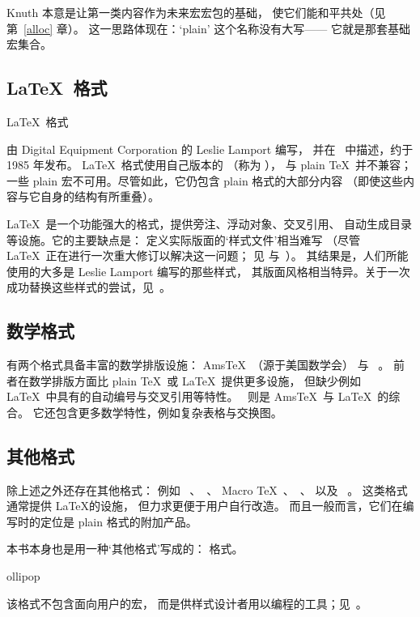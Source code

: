 \documentclass[a4paper]{rapport3}
\def\AmsTeX{Ams\TeX}
\def\term#1\par{\index{#1}}
\begin{document}
Knuth 本意是让第一类内容作为未来宏宏包的基础，
使它们能和平共处（见第~\ref{alloc} 章）。
这一思路体现在：`plain' 这个名称没有大写——
它就是那套基础宏集合。

\subsection{\LaTeX\ 格式}

\LaTeX\ 格式\term\LaTeX\par
由 Digital Equipment Corporation 的 Leslie Lamport 编写，
并在~\cite{Lamport:LaTeX} 中描述，约于 1985 年发布。
\LaTeX\ 格式使用自己版本的 （称为 ），
与 plain \TeX\ 并不兼容；
一些 plain 宏不可用。尽管如此，它仍包含 plain 格式的大部分内容
（即使这些内容与它自身的结构有所重叠）。

\LaTeX\ 是一个功能强大的格式，提供旁注、浮动对象、交叉引用、
自动生成目录等设施。它的主要缺点是：
定义实际版面的`样式文件'相当难写
（尽管 \LaTeX\ 正在进行一次重大修订以解决这一问题；
见 \cite{Frank} 与~\cite{Frank2}）。
其结果是，人们所能使用的大多是 Leslie Lamport 编写的那些样式，
其版面风格相当特异。关于一次成功替换这些样式的尝试，见~\cite{BEP}。

\subsection{数学格式}

有两个格式具备丰富的数学排版设施：
\AmsTeX~\cite{Ams}（源于美国数学会）
与 \LamsTeX~\cite{Lams}。
前者在数学排版方面比 plain \TeX\ 或 \LaTeX\ 提供更多设施，
但缺少例如 \LaTeX\ 中具有的自动编号与交叉引用等特性。
\LamsTeX\ 则是 \AmsTeX\ 与 \LaTeX\ 的综合。
它还包含更多数学特性，例如复杂表格与交换图。

\subsection{其他格式}

除上述之外还存在其他格式：
例如 ~\cite{Phyzzx}、~\cite{TeXsis}、
Macro \TeX~\cite{Amy}、~\cite{Berry}、
以及 ~\cite{TeXT1}。
这类格式通常提供 \LaTeX 的设施，
但力求更便于用户自行改造。
而且一般而言，它们在编写时的定位是 plain 格式的附加产品。

本书本身也是用一种`其他格式'写成的：
 格式。
\term Lollipop\par
该格式不包含面向用户的宏，
而是供样式设计者用以编程的工具；见~\cite{EL}。
\end{document}
